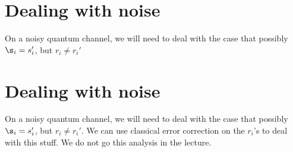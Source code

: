 \documentclass[11pt]{article}
\begin{document}
\section{Dealing with noise}

On a noisy quantum channel, we will need to deal with the case that possibly
$\s_i = s_i'$, but $r_i \neq r_i'$


\section{Dealing with noise}

On a noisy quantum channel, we will need to deal with the case that possibly
$\s_i = s_i'$, but $r_i \neq r_i'$. We can use classical error correction on
the $r_i$'s to deal with this stuff. We do not go this analysis in the lecture.
\end{document}

